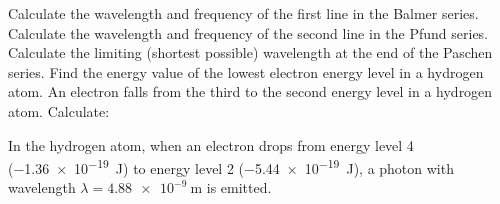 \documentclass[answers]{exam}
\theoremstyle{definition}
\begin{document}
\begin{questions}
  \question Calculate the wavelength and frequency of the first line in the Balmer series.
  \question Calculate the wavelength and frequency of the second line in the Pfund series.
  \question Calculate the limiting (shortest possible) wavelength at the end of the Paschen series.
  \question Find the energy value of the lowest electron energy level in a hydrogen atom.
  \question An electron falls from the third to the second energy level in a hydrogen atom. Calculate:
  \question
  \question In the hydrogen atom, when an electron drops from energy level 4 (\SI{-1.36e-19}{\joule}) to
            energy level 2 (\SI{-5.44e-19}{\joule}), a photon with wavelength $ \lambda = \SI{4.88e-9}{\metre} $ is emitted.
\end{questions}
\end{document}
